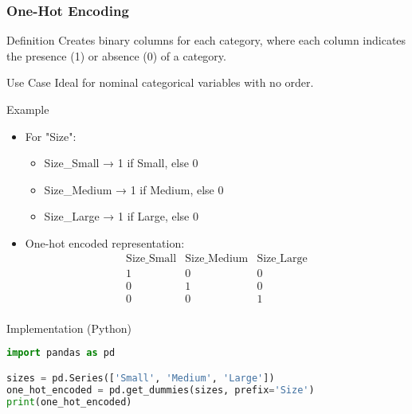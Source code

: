 \documentclass[aspectratio=169]{beamer}
\begin{document}
\begin{frame}[fragile]
    \frametitle{One-Hot Encoding}
    \begin{block}{Definition}
        Creates binary columns for each category, 
        where each column indicates the presence (1) or absence (0) of a category.
    \end{block}
    \begin{block}{Use Case}
        Ideal for nominal categorical variables with no order.
    \end{block}
    \begin{block}{Example}
        \begin{itemize}
            \item For "Size": 
            \begin{itemize}
                \item Size\_Small → 1 if Small, else 0 
                \item Size\_Medium → 1 if Medium, else 0 
                \item Size\_Large → 1 if Large, else 0
            \end{itemize}
            \item One-hot encoded representation:
            \[
            \begin{array}{c|c|c}
            \text{Size\_Small} & \text{Size\_Medium} & \text{Size\_Large} \\
            \hline
            1 & 0 & 0 \\
            0 & 1 & 0 \\
            0 & 0 & 1 \\
            \end{array}
            \]
        \end{itemize}
    \end{block}
    \begin{block}{Implementation (Python)}
        \begin{lstlisting}[language=Python]
import pandas as pd

sizes = pd.Series(['Small', 'Medium', 'Large'])
one_hot_encoded = pd.get_dummies(sizes, prefix='Size')
print(one_hot_encoded)
        \end{lstlisting}
    \end{block}
\end{frame}
\end{document}
